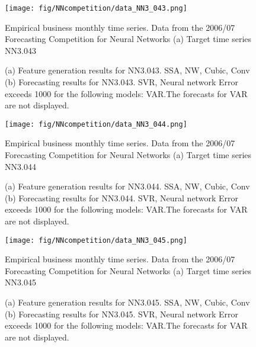\documentclass[12pt]{article}
\begin{document}
\begin{figure}
\centering
\texttt{[image: fig/NNcompetition/data\_NN3\_043.png]}
\caption{Empirical business monthly time series. Data from the 2006/07 Forecasting Competition for Neural Networks	(a) Target time series	NN3.043	}
\end{figure}


\begin{figure}
\centering
{}
\caption{(a)	Feature generation results for	NN3.043.	SSA, NW, Cubic, Conv	(b)	Forecasting results for	NN3.043.	SVR, Neural network	Error exceeds 1000 for the following models: VAR.The forecasts for VAR are not displayed.	}
\end{figure}


\begin{figure}
\centering
\texttt{[image: fig/NNcompetition/data\_NN3\_044.png]}
\caption{Empirical business monthly time series. Data from the 2006/07 Forecasting Competition for Neural Networks	(a) Target time series	NN3.044	}
\end{figure}


\begin{figure}
\centering
{}
\caption{(a)	Feature generation results for	NN3.044.	SSA, NW, Cubic, Conv	(b)	Forecasting results for	NN3.044.	SVR, Neural network	Error exceeds 1000 for the following models: VAR.The forecasts for VAR are not displayed.	}
\end{figure}


\begin{figure}
\centering
\texttt{[image: fig/NNcompetition/data\_NN3\_045.png]}
\caption{Empirical business monthly time series. Data from the 2006/07 Forecasting Competition for Neural Networks	(a) Target time series	NN3.045	}
\end{figure}


\begin{figure}
\centering
{}
\caption{(a)	Feature generation results for	NN3.045.	SSA, NW, Cubic, Conv	(b)	Forecasting results for	NN3.045.	SVR, Neural network	Error exceeds 1000 for the following models: VAR.The forecasts for VAR are not displayed.	}
\end{figure}
\end{document}
